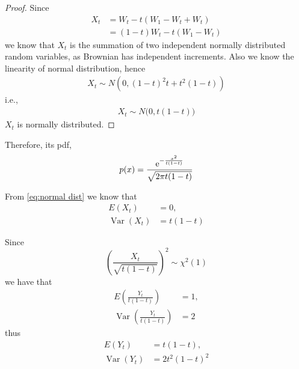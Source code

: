 \documentclass{homework}
\DeclareMathOperator{\Var}{Var}
\begin{document}
    \problem
    \begin{subproblem}
        \item
        \begin{proof}
            Since
            \[\begin{aligned}
                X_t&=W_t-t(W_1-W_t+W_t)\\
                   &=(1-t)W_t-t(W_1-W_t) 
            \end{aligned}\]
            we know that $X_t$ is the summation of two
            independent normally distributed random variables,
            as Brownian has independent increments. Also we know
            the linearity of normal distribution, hence
            \begin{equation*}
                \begin{aligned}
                X_t\sim N\left(0,(1-t)^2t+t^2(1-t)\right)
                \end{aligned}
            \end{equation*}
            i.e.,
            \begin{equation}
                \label{eq:normal dist}
                \begin{aligned}
                X_t\sim N\big(0,t(1-t)\big)
                \end{aligned}
            \end{equation}
            $X_t$ is normally distributed.
        \end{proof}

        Therefore, its pdf,
        \[p(x)=\frac{\mathrm e^{-\frac{x^2}{t(1-t)}}}{\sqrt{2\pi t(1-t)}}\]

        \item
        From \cref{eq:normal dist} we know that
        \begin{align*}
            E(X_t)&=0,\\
            \Var(X_t)&=t(1-t)
        \end{align*}

        \item
        Since
        \[\left(\frac{X_t}{\sqrt{t(1-t)}}\right)^2\sim\chi^2(1)\]
        we have that
        \begin{align*}
            E\left(\frac{Y_t}{t(1-t)}\right)&=1,\\
            \Var\left(\frac{Y_t}{t(1-t)}\right)&=2
        \end{align*}
        thus
        \begin{align*}
            E(Y_t)&=t(1-t),\\
            \Var(Y_t)&=2t^2(1-t)^2
        \end{align*}
    \end{subproblem}
\end{document}

